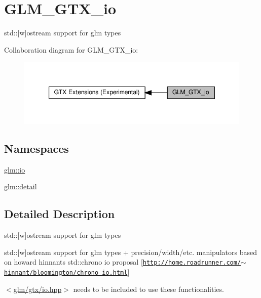 \hypertarget{group__gtx__io}{}\section{G\+L\+M\+\_\+\+G\+T\+X\+\_\+io}
\label{group__gtx__io}


std\+:\+:\mbox{[}w\mbox{]}ostream support for glm types  


Collaboration diagram for G\+L\+M\+\_\+\+G\+T\+X\+\_\+io\+:\nopagebreak
\begin{figure}[H]
\begin{center}
\leavevmode
\includegraphics[width=347pt]{group__gtx__io}
\end{center}
\end{figure}
\subsection*{Namespaces}
\begin{DoxyCompactItemize}
\item 
 \hyperlink{namespaceglm_1_1io}{glm\+::io}
\item 
 \hyperlink{namespaceglm_1_1detail}{glm\+::detail}
\end{DoxyCompactItemize}


\subsection{Detailed Description}
std\+:\+:\mbox{[}w\mbox{]}ostream support for glm types 

std\+:\+:\mbox{[}w\mbox{]}ostream support for glm types + precision/width/etc. manipulators based on howard hinnant\textquotesingle{}s std\+::chrono io proposal \mbox{[}\href{http://home.roadrunner.com/~hinnant/bloomington/chrono_io.html}{\tt http\+://home.\+roadrunner.\+com/$\sim$hinnant/bloomington/chrono\+\_\+io.\+html}\mbox{]}

$<$\hyperlink{io_8hpp}{glm/gtx/io.\+hpp}$>$ needs to be included to use these functionalities. 